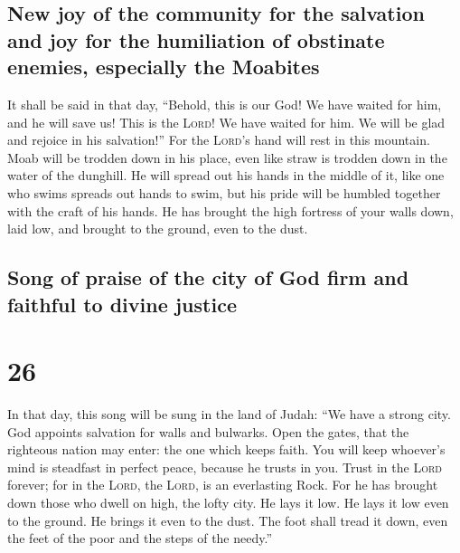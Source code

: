 \hypertarget{new-joy-of-the-community-for-the-salvation-and-joy-for-the-humiliation-of-obstinate-enemies-especially-the-moabites}{%
\subsection{New joy of the community for the salvation and joy for the
humiliation of obstinate enemies, especially the
Moabites}\label{new-joy-of-the-community-for-the-salvation-and-joy-for-the-humiliation-of-obstinate-enemies-especially-the-moabites}}

 It shall be said in that day, ``Behold, this is our God!
We have waited for him, and he will save us! This is the \textsc{Lord}!
We have waited for him. We will be glad and rejoice in his salvation!''
 For the \textsc{Lord}'s hand will rest in this mountain.
Moab will be trodden down in his place, even like straw is trodden down
in the water of the dunghill.  He will spread out his
hands in the middle of it, like one who swims spreads out hands to swim,
but his pride will be humbled together with the craft of his hands.
 He has brought the high fortress of your walls down,
laid low, and brought to the ground, even to the dust.

\hypertarget{song-of-praise-of-the-city-of-god-firm-and-faithful-to-divine-justice}{%
\subsection{Song of praise of the city of God firm and faithful to
divine
justice}\label{song-of-praise-of-the-city-of-god-firm-and-faithful-to-divine-justice}}

\hypertarget{section-25}{%
\section{26}\label{section-25}}

 In that day, this song will be sung in the land of Judah:
``We have a strong city. God appoints salvation for walls and bulwarks.
 Open the gates, that the righteous nation may enter: the
one which keeps faith.  You will keep whoever's mind is
steadfast in perfect peace, because he trusts in you. 
Trust in the \textsc{Lord} forever; for in the \textsc{Lord}, the
\textsc{Lord}, is an everlasting Rock.  For he has brought
down those who dwell on high, the lofty city. He lays it low. He lays it
low even to the ground. He brings it even to the dust. 
The foot shall tread it down, even the feet of the poor and the steps of
the needy.''


